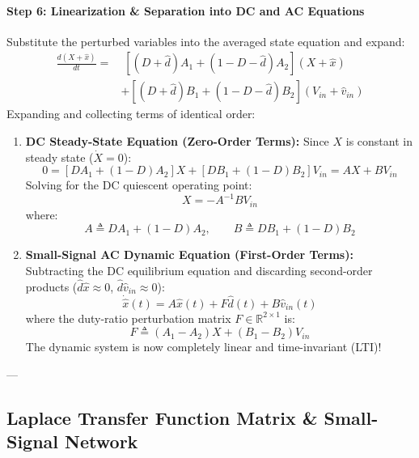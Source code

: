 \paragraph{Step 6: Linearization \& Separation into DC and AC Equations}
Substitute the perturbed variables into the averaged state equation and expand:
\begin{equation}
\begin{aligned}
\frac{d(X + \hat{x})}{dt} = &\; \left[ (D + \hat{d}) A_1 + (1 - D - \hat{d}) A_2 \right] (X + \hat{x}) \\
&+ \left[ (D + \hat{d}) B_1 + (1 - D - \hat{d}) B_2 \right] (V_{in} + \hat{v}_{in})
\end{aligned}
\end{equation}
Expanding and collecting terms of identical order:
\begin{enumerate}
  \item \textbf{DC Steady-State Equation (Zero-Order Terms):}
  Since $X$ is constant in steady state ($\dot{X} = 0$):
  \begin{equation}
  0 = \left[ D A_1 + (1-D) A_2 \right] X + \left[ D B_1 + (1-D) B_2 \right] V_{in} = A X + B V_{in}
  \end{equation}
  Solving for the DC quiescent operating point:
  \begin{equation}
  \boxed{X = -A^{-1} B V_{in}}
  \end{equation}
  where:
  \begin{equation}
  A \triangleq D A_1 + (1-D) A_2, \qquad B \triangleq D B_1 + (1-D) B_2
  \end{equation}

  \item \textbf{Small-Signal AC Dynamic Equation (First-Order Terms):}
  Subtracting the DC equilibrium equation and discarding second-order products ($\hat{d}\hat{x} \approx 0$, $\hat{d}\hat{v}_{in} \approx 0$):
  \begin{equation}
  \boxed{\dot{\hat{x}}(t) = A \hat{x}(t) + F \hat{d}(t) + B \hat{v}_{in}(t)}
  \end{equation}
  where the duty-ratio perturbation matrix $F \in \mathbb{R}^{2\times 1}$ is:
  \begin{equation}
  \boxed{F \triangleq (A_1 - A_2) X + (B_1 - B_2) V_{in}}
  \end{equation}
  The dynamic system is now completely linear and time-invariant (LTI)!
\end{enumerate}

---

\subsection{Laplace Transfer Function Matrix \& Small-Signal Network}

